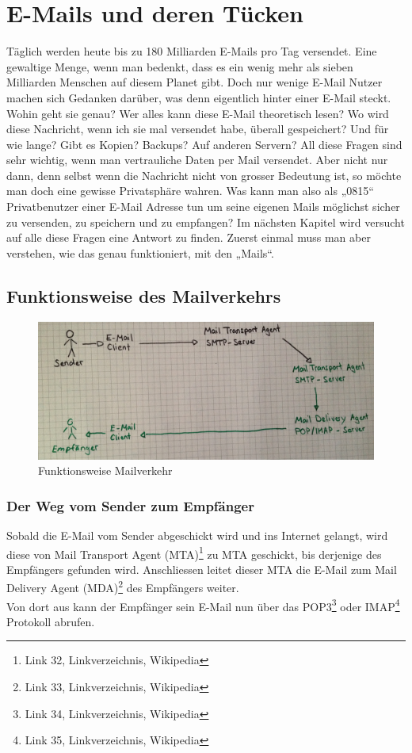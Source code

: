 \newpage
\section{E-Mails und deren Tücken}
Täglich werden heute bis zu 180 Milliarden E-Mails pro Tag versendet. Eine gewaltige Menge, wenn man bedenkt, dass es ein wenig mehr als sieben Milliarden Menschen auf diesem Planet gibt.
Doch nur wenige E-Mail Nutzer machen sich Gedanken darüber, was denn eigentlich hinter einer E-Mail steckt. Wohin geht sie genau? Wer alles kann diese E-Mail theoretisch lesen? Wo wird diese Nachricht, wenn ich sie mal versendet habe, überall gespeichert? Und für wie lange? Gibt es Kopien? Backups? Auf anderen Servern?
All diese Fragen sind sehr wichtig, wenn man vertrauliche Daten per Mail versendet. Aber nicht nur dann, denn selbst wenn die Nachricht nicht von grosser Bedeutung ist, so möchte man doch eine gewisse Privatsphäre wahren.
Was kann man also als „0815“ Privatbenutzer einer E-Mail Adresse tun um seine eigenen Mails möglichst sicher zu versenden, zu speichern und  zu empfangen?
Im nächsten Kapitel wird versucht auf alle diese Fragen eine Antwort zu finden. Zuerst einmal muss man aber verstehen, wie das genau funktioniert, mit den „Mails“.

\subsection{Funktionsweise des Mailverkehrs}

\begin{figure}[H]
\centering
\noindent\includegraphics[scale=0.14]{images/mailverkehr.jpg}
\caption{Funktionsweise Mailverkehr}
\end{figure}

\subsubsection{Der Weg vom Sender zum Empfänger}
Sobald die E-Mail vom Sender abgeschickt wird und ins Internet gelangt, wird diese von Mail Transport Agent (MTA)\footnote{Link 32, Linkverzeichnis, Wikipedia} zu MTA geschickt, bis derjenige des Empfängers gefunden wird. Anschliessen leitet dieser MTA die E-Mail zum Mail Delivery Agent (MDA)\footnote{Link 33, Linkverzeichnis, Wikipedia} des Empfängers weiter. \\
Von dort aus kann der Empfänger sein E-Mail nun über das POP3\footnote{Link 34, Linkverzeichnis, Wikipedia} oder IMAP\footnote{Link 35, Linkverzeichnis, Wikipedia} Protokoll abrufen.

